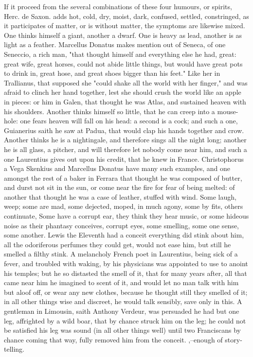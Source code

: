 {If it proceed from the several combinations of these four humours, or spirits,
Herc. de Saxon. adds hot, cold, dry, moist, dark, confused, settled,
constringed, as it participates of matter, or is without matter, the symptoms
are likewise mixed. One thinks himself a giant, another a dwarf. One is heavy
as lead, another is as light as a feather. Marcellus Donatus
 makes mention out of Seneca, of one
Seneccio, a rich man, "that thought himself and everything
else he had, great: great wife, great horses, could not abide little things,
but would have great pots to drink in, great hose, and great shoes bigger than
his feet." Like her in Trallianus, that supposed she
"could shake all the world with her finger," and was afraid to clinch her hand
together, lest she should crush the world like an apple in pieces: or him in
Galen, that thought he was Atlas, and sustained heaven
with his shoulders. Another thinks himself so little, that he can creep into a
mouse-hole: one fears heaven will fall on his head: a second is a cock; and
such a one, Guianerius saith he saw at Padua, that would
clap his hands together and crow. Another thinks he is a
nightingale, and therefore sings all the night long; another he is all glass, a
pitcher, and will therefore let nobody come near him, and such a one
Laurentius gives out upon his credit, that he knew in
France. Christophorus a Vega  Skenkius
and Marcellus Donatus  have many such
examples, and one amongst the rest of a baker in Ferrara that thought he was
composed of butter, and durst not sit in the sun, or come near the fire for
fear of being melted: of another that thought he was a case of leather, stuffed
with wind. Some laugh, weep; some are mad, some dejected, moped, in much agony,
some by fits, others continuate, \etc{} Some have a corrupt ear, they think
they hear music, or some hideous noise as their phantasy conceives, corrupt
eyes, some smelling, some one sense, some another. Lewis
the Eleventh had a conceit everything did stink about him, all the odoriferous
perfumes they could get, would not ease him, but still he smelled a filthy
stink. A melancholy French poet in Laurentius, being sick
of a fever, and troubled with waking, by his physicians was appointed to use
 to anoint his temples; but he so distasted the smell of
it, that for many years after, all that came near him he imagined to scent of
it, and would let no man talk with him but aloof off, or wear any new clothes,
because he thought still they smelled of it; in all other things wise and
discreet, he would talk sensibly, save only in this. A gentleman in Limousin,
saith Anthony Verdeur, was persuaded he had but one leg, affrighted by a wild
boar, that by chance struck him on the leg; he could not be satisfied his leg
was sound (in all other things well) until two Franciscans by chance coming
that way, fully removed him from the conceit. ,--enough of story-telling.

}
